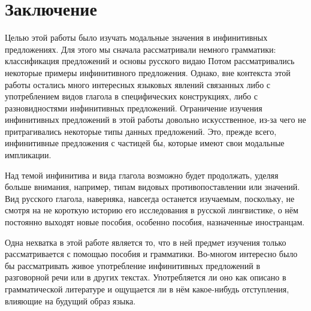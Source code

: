 \section{Заключение}

Целью этой работы было изучать модальные значения в инфинитивных предложениях. Для этого мы сначала рассматривали немного грамматики: классификация предложений и основы русского видаю Потом рассматривались некоторые примеры инфинитивного предложения. Однако, вне контекста этой работы остались много интересных языковых явлений связанных либо с употреблением видов глагола в специфических конструкциях, либо с разновидностями инфинитивных предложений. Ограничение изучения инфинитивных предложений в этой работы довольно искусственное, из-за чего не притрагивались некоторые типы данных предложений. Это, прежде всего, инфинитивные предложения с частицей бы, которые имеют свои модальные импликации. 

Над темой инфинитива и вида глагола возможно будет продолжать, уделяя больше внимания, например, типам видовых противопоставлении или значений. Вид русского глагола, наверняка, навсегда останется изучаемым, поскольку, не смотря на не короткую историю его исследования в русской лингвистике, о нём постоянно выходят новые пособия, особенно пособия, назначенные иностранцам.

Одна нехватка в этой работе является то, что в ней предмет изучения только рассматривается с помощью пособия и грамматики. Во-многом интересно было бы рассматривать живое употребление инфинитивных предложений в разговорной речи или в других текстах. Употребляется ли оно как описано в грамматической литературе и ощущается ли в нём какое-нибудь отступления, влияющие на будущий образ языка.

%
%






